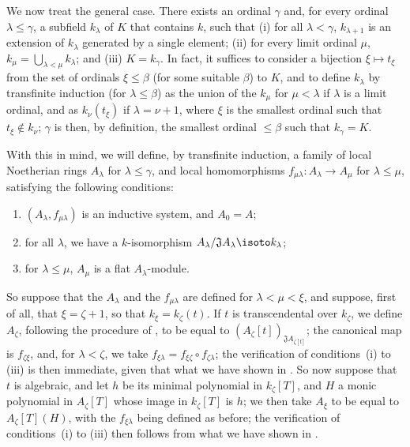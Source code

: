 \begin{env}[10.3.1.4]
\label{0.10.3.1.4}
We now treat the general case.
There exists an ordinal $\gamma$ and, for every ordinal $\lambda\leq\gamma$, a subfield $k_\lambda$ of $K$ that contains $k$, such that (i) for all $\lambda<\gamma$, $k_{\lambda+1}$ is an extension of $k_\lambda$ generated by a single element; (ii) for every limit ordinal $\mu$, $k_\mu=\bigcup_{\lambda<\mu}k_\lambda$; and (iii) $K=k_\gamma$.
In fact, it suffices to consider a bijection $\xi\mapsto t_\xi$ from the set of ordinals $\xi\leq\beta$ (for some suitable $\beta$) to $K$, and to define $k_\lambda$ by transfinite induction (for $\lambda\leq\beta$) as the union of the $k_\mu$ for $\mu<\lambda$ if $\lambda$ is a limit ordinal, and as $k_\nu(t_\xi)$ if $\lambda=\nu+1$, where $\xi$ is the smallest ordinal such that $t_\xi\not\in k_\nu$;
$\gamma$ is then, by definition, the smallest ordinal $\leq\beta$ such that $k_\gamma=K$.

With this in mind, we will define, by transfinite induction, a family of local Noetherian rings $A_\lambda$ for $\lambda\leq\gamma$, and local homomorphisms $f_{\mu\lambda}:A_\lambda\to A_\mu$ for $\lambda\leq\mu$, satisfying the following conditions:
\begin{enumerate}
  \item[(i)] $(A_\lambda,f_{\mu\lambda})$ is an inductive system, and $A_0=A$;
  \item[(ii)] for all $\lambda$, we have a $k$-isomorphism $A_\lambda/\mathfrak{J}A_\lambda\isoto k_\lambda$;
  \item[(iii)] for $\lambda\leq\mu$, $A_\mu$ is a flat $A_\lambda$-module.
\end{enumerate}

So suppose that the $A_\lambda$ and the $f_{\mu\lambda}$ are defined for $\lambda<\mu<\xi$, and suppose, first of all, that $\xi=\zeta+1$, so that $k_\xi=k_\zeta(t)$.
If $t$ is transcendental over $k_\zeta$, we define $A_\zeta$, following the procedure of , to be equal to $(A_\zeta[t])_{\mathfrak{J}A_{\zeta[t]}}$;
the canonical map is $f_{\zeta\xi}$, and, for $\lambda<\zeta$, we take $f_{\xi\lambda}=f_{\xi\zeta}\circ f_{\zeta\lambda}$;
the verification of conditions~(i) to (iii) is then immediate, given that what we have shown in .
So now suppose that $t$ is algebraic, and let $h$ be its minimal polynomial in $k_\zeta[T]$, and $H$ a monic polynomial in $A_\zeta[T]$ whose image in $k_\zeta[T]$ is $h$;
we then take $A_\xi$ to be equal to $A_\zeta[T](H)$, with the $f_{\xi\lambda}$ being defined as before;
the verification of conditions~(i) to (iii) then follows from what we have shown in .


\end{env}
